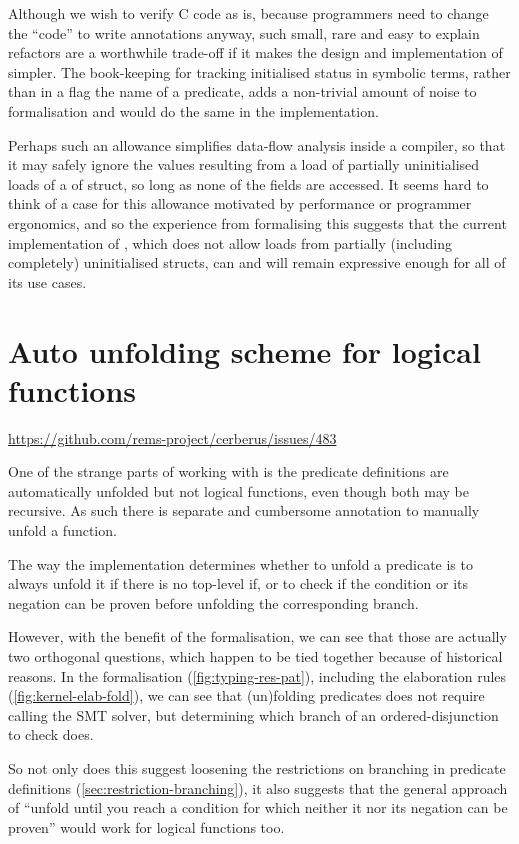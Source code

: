 Although we wish to verify C code as is, because programmers need to change the
``code'' to write annotations anyway, such small, rare and easy to explain
refactors are a worthwhile trade-off if it makes the design and implementation
of  simpler. The book-keeping for tracking initialised status in
symbolic terms, rather than in a flag the name of a predicate, adds a
non-trivial amount of noise to formalisation and would do the same in the
implementation.

Perhaps such an allowance simplifies data-flow analysis inside a compiler, so
that it may safely ignore the values resulting from a load of partially
uninitialised loads of a of struct, so long as none of the fields are accessed.
It seems hard to think of a case for this allowance motivated by performance or
programmer ergonomics, and so the experience from formalising this suggests
that the current implementation of , which does not allow loads from
partially (including completely) uninitialised structs, can and will remain
expressive enough for all of its use cases.

\section{Auto unfolding scheme for logical functions}\label{sec:auto-unfold-functions}

\url{https://github.com/rems-project/cerberus/issues/483}

One of the strange parts of working with  is the predicate definitions are
automatically unfolded but not logical functions, even though both may be
recursive. As such there is separate and cumbersome annotation to manually
unfold a function.

The way the implementation determines whether to unfold a predicate is
to always unfold it if there is no top-level if, or to check if the condition
or its negation can be proven before unfolding the corresponding branch.

However, with the benefit of the formalisation, we can see that those are
actually two orthogonal questions, which happen to be tied together because of
historical reasons. In the formalisation (\cref{fig:typing-res-pat}), including
the elaboration rules (\cref{fig:kernel-elab-fold}),  we can see that (un)folding %
predicates does not require calling the SMT solver, but determining which
branch of an ordered-disjunction to check does.

So not only does this suggest loosening the restrictions on branching in
predicate definitions (\cref{sec:restriction-branching}), it also suggests that
the general approach of ``unfold until you reach a condition for which neither
it nor its negation can be proven'' would work for logical functions too.

